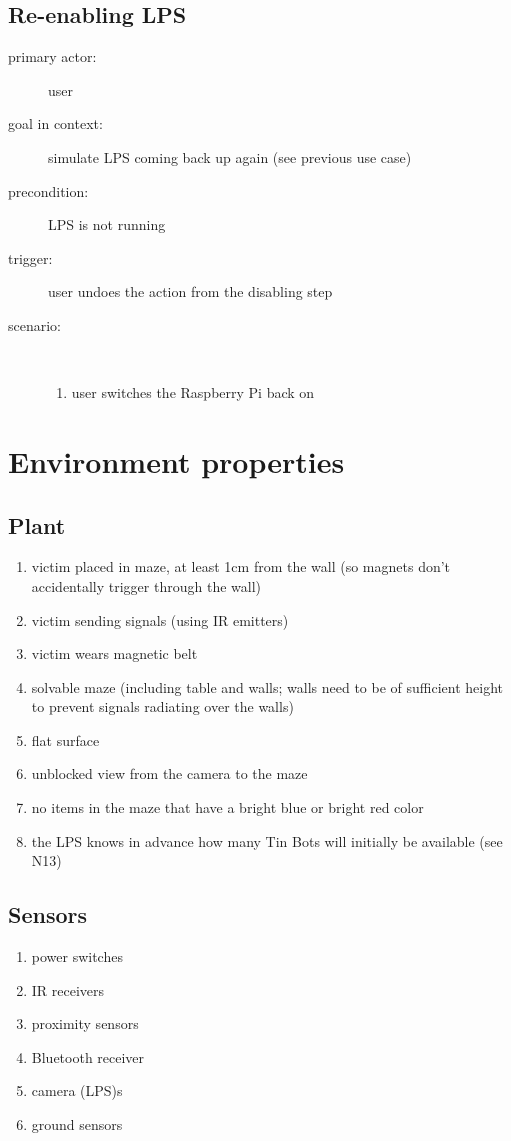 \documentclass[a4paper,parskip,headheight=38pt]{scrartcl} %
\begin{document}
\subsection{Re-enabling LPS}
\begin{description}
\item[primary actor:] user
\item[goal in context:] simulate LPS coming back up again (see previous use case)
\item[precondition:] LPS is not running
\item[trigger:] user undoes the action from the disabling step
\item[scenario:]\
\begin{enumerate}
	\item user switches the Raspberry Pi back on
\end{enumerate}
\end{description}

\section{Environment properties}

\subsection{Plant}
\begin{enumerate}[label=\plant]
\item victim placed in maze, at least 1cm from the wall (so magnets don't accidentally trigger through the wall)
\item victim sending signals (using IR emitters)
\item victim wears magnetic belt
\item solvable maze (including table and walls; walls need to be of sufficient height to prevent signals radiating over the walls)
\item flat surface
\item unblocked view from the camera to the maze
\item no items in the maze that have a bright blue or bright red color
\item the LPS knows in advance how many Tin Bots will initially be available (see N13)
\end{enumerate}

\subsection{Sensors}
\begin{enumerate}[label=\sensors]
\item power switches
\item IR receivers
\item proximity sensors
\item Bluetooth receiver
\item camera (LPS)s
\item ground sensors
\end{enumerate}
\end{document}
